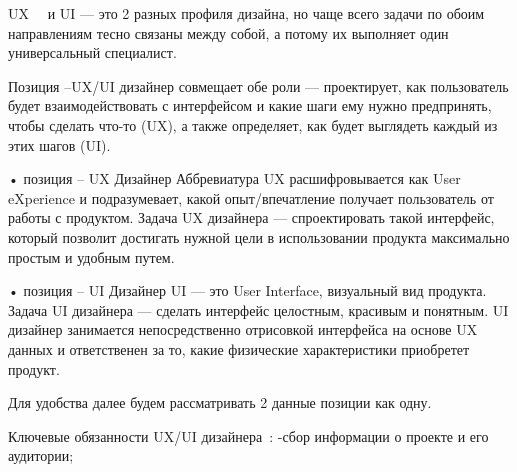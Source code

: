 \documentclass{../industrial-development}
\begin{document}
\lecturenotes

UX~\cite{hh}~\cite{itcf}  и UI — это 2 разных профиля дизайна, но чаще всего задачи по обоим направлениям тесно связаны между собой, а потому их выполняет один универсальный специалист.

Позиция –UX/UI дизайнер совмещает обе роли — проектирует, как пользователь будет взаимодействовать с интерфейсом и какие шаги ему нужно предпринять, чтобы сделать что-то (UX), а также определяет, как будет выглядеть каждый из этих шагов (UI).

•	позиция – UX Дизайнер
Аббревиатура UX расшифровывается как User eXperience и подразумевает, какой опыт/впечатление получает пользователь от работы с продуктом. Задача UX дизайнера — спроектировать такой интерфейс, который позволит достигать нужной цели в использовании продукта максимально простым и удобным путем.

•	позиция – UI Дизайнер
UI — это User Interface, визуальный вид продукта. Задача UI дизайнера — сделать интерфейс целостным, красивым и понятным. UI дизайнер занимается непосредственно отрисовкой интерфейса на основе UX данных и ответственен за то, какие физические характеристики приобретет продукт.

Для удобства далее будем рассматривать 2 данные позиции как одну.


\lecturenotes

Ключевые обязанности UX/UI дизайнера~\cite{rab}:
-сбор информации о проекте и его аудитории;
\end{document}
